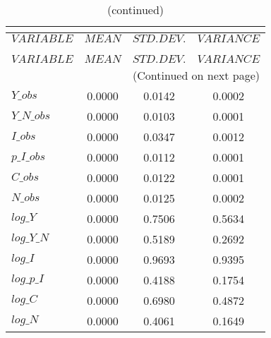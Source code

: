  
\begin{center}
\begin{longtable}{lccc} 
\caption{THEORETICAL MOMENTS}\\
 \label{Table:th_moments}\\
\toprule 
$VARIABLE   $	 & 	 $         MEAN$	 & 	 $    STD. DEV.$	 & 	 $     VARIANCE$\\
\midrule \endfirsthead 
\caption{(continued)}\\
 \toprule \\ 
$VARIABLE   $	 & 	 $         MEAN$	 & 	 $    STD. DEV.$	 & 	 $     VARIANCE$\\
\midrule \endhead 
\midrule \multicolumn{4}{r}{(Continued on next page)} \\ \bottomrule \endfoot 
\bottomrule \endlastfoot 
$Y\_obs     $	 & 	       0.0000	 & 	       0.0142	 & 	       0.0002 \\ 
$Y\_N\_obs  $	 & 	       0.0000	 & 	       0.0103	 & 	       0.0001 \\ 
$I\_obs     $	 & 	       0.0000	 & 	       0.0347	 & 	       0.0012 \\ 
$p\_I\_obs  $	 & 	       0.0000	 & 	       0.0112	 & 	       0.0001 \\ 
$C\_obs     $	 & 	       0.0000	 & 	       0.0122	 & 	       0.0001 \\ 
$N\_obs     $	 & 	       0.0000	 & 	       0.0125	 & 	       0.0002 \\ 
$log\_Y     $	 & 	       0.0000	 & 	       0.7506	 & 	       0.5634 \\ 
$log\_Y\_N  $	 & 	       0.0000	 & 	       0.5189	 & 	       0.2692 \\ 
$log\_I     $	 & 	       0.0000	 & 	       0.9693	 & 	       0.9395 \\ 
$log\_p\_I  $	 & 	       0.0000	 & 	       0.4188	 & 	       0.1754 \\ 
$log\_C     $	 & 	       0.0000	 & 	       0.6980	 & 	       0.4872 \\ 
$log\_N     $	 & 	       0.0000	 & 	       0.4061	 & 	       0.1649 \\ 
\end{longtable}
 \end{center}

